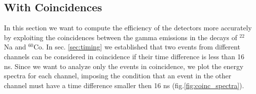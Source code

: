 \subsection{With Coincidences}

In this section we want to compute the efficiency of the detectors more accurately by exploiting the coincidences between the gamma emissions in the decays of $^{22}$Na and $^{60}$Co. In sec. \ref{sec:timing} we established that two events from different channels can be considered in coincidence if their time difference is less than 16 ns. Since we want to analyze only the events in coincidence, we plot the energy spectra for each channel, imposing the condition that an event in the other channel must have a time difference smaller then 16 ns (fig.\ref{fig:coinc_spectra}). 

\begin{figure}[H]
	\begin{minipage}[c]{0.5\linewidth}
	\end{minipage}
	\begin{minipage}[]{0.5\linewidth}
	\centering

\end{minipage}
\end{figure}
